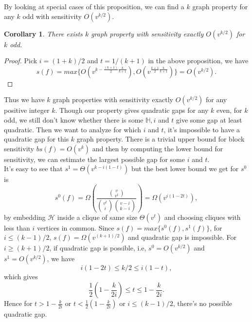 \documentclass[psamsfonts]{amsart}
\newtheorem{cor}[theorem]{Corollary}
\theoremstyle{definition}
\theoremstyle{remark}
\numberwithin{equation}{section}
\begin{document}
	By looking at special cases of this proposition, we can find a $k$ graph property for any $k$ odd with sensitivity $O(v^{k/2})$.
	\begin{cor}
		There exists $k$ graph property with sensitivity exactly $O(v^{k/2})$ for $k$ odd.
	\end{cor}
	\begin{proof}
		Pick $i=(1+k)/2$ and $t = 1/(k+1)$ in the above proposition, we have
		\begin{equation}
			s(f) = max\{O(v^{k- \frac{(k+1)}{2}  \frac{k}{k+1}}), O(v^{\frac{k+1}{2}  \frac{k}{k+1}})\} = O(v^{k/2}).
		\end{equation}
	\end{proof}
	Thus we have $k$ graph properties with sensitivity exactly $O(v^{k/2})$ for any positive integer $k$. Though our property gives quadratic gaps for any $k$ even, for $k$ odd, we still don't know whether there is some $\mathbb{H},i$ and $t$ give some gap at least quadratic. Then we want to analyze for which $i$ and $t$, it's impossible to have a quadratic gap for this $k$ graph property. There is a trivial upper bound for block sensitivity $bs(f) = O(v^k)$ and then by computing the lower bound for sensitivity, we can estimate the largest possible gap for some $i$ and $t$.\\
	\indent It's easy to see that $s^1 = \Theta(v^{k-i(1-t)})$ but the best lower bound we get for $s^0$ is 
	\begin{equation}
		s^0(f) = \Omega(\frac{{v \choose{v^t}}}{{v^t \choose{i}}{v-i \choose{k-i}}}) = \Omega(v^{i(1-2t)}),
	\end{equation}
		by embedding $\mathcal{H}$ inside a clique of same size $\Theta(v^t)$ and choosing cliques with less than $i$ vertices in common. Since $s(f) = max \{ s^0(f), s^1(f) \}$, for $i \leq (k-1)/2$, $s(f) = \Omega(v^{(k+1)/2})$ and quadratic gap is impossible. For $i \geq (k+1)/2$, if quadratic gap is possible, i.e, $s^0 = O(v^{k/2})$ and $s^1 = O(v^{k/2})$, we have
		\begin{equation}
			i(1-2t) \leq k/2 \leq i(1-t),			
		\end{equation}
		which gives
		\begin{equation}
			\frac{1}{2} (1- \frac{k}{2i}) \leq t \leq 1- \frac{k}{2i}.
		\end{equation}
		Hence for $t > 1- \frac{k}{2i}$ or $t < \frac{1}{2} (1- \frac{k}{2i})$ or $i \leq (k-1)/2$, there's no possible quadratic gap.
\end{document}
